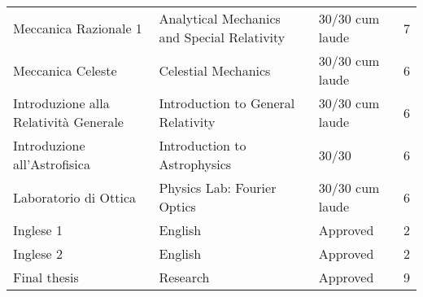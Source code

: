 \documentclass[a4paper,10pt,notitlepage]{paper}
\begin{document}
{\begin{tabular*}{\linewidth}{lll@{\hspace{0.7cm}}l@{\extracolsep{\fill}}}
Meccanica Razionale 1					&  Analytical Mechanics and Special Relativity& 30/30  cum laude &7\\	
Meccanica Celeste						&  Celestial Mechanics&  30/30  cum laude&6\\	
Introduzione alla Relatività Generale			&  Introduction to General Relativity& 30/30 cum laude &6\\	
Introduzione all'Astrofisica					&  Introduction to Astrophysics&  30/30 &6\\	
Laboratorio di Ottica						&  Physics Lab: Fourier Optics&  30/30  cum laude&6\\	
Inglese 1								&  English & Approved  &2\\	
Inglese 2								&  English & Approved &2\\	
Final thesis						& Research  & Approved &  9\\
\end{tabular*}}
\end{document}
